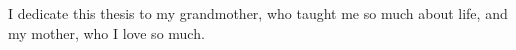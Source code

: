 \mbox{}\\\mbox{}\\\mbox{}\\\mbox{}\\\mbox{}\\ %
\begin{center}
I dedicate this thesis to my grandmother, who taught me so much about life, and my mother, who I love so much.
\end{center}
